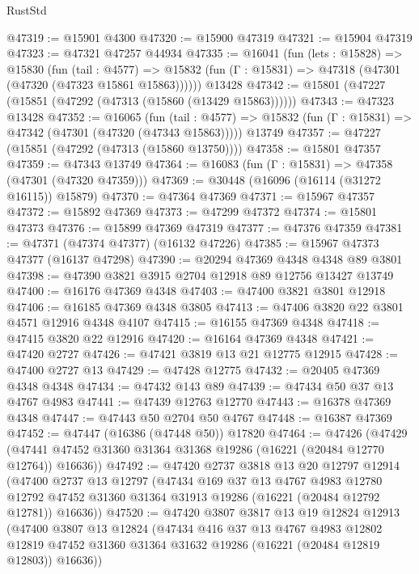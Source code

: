\begin{lexlean}{RustStd}
\begin{coremodule}
@47319 := @15901 @4300
@47320 := @15900 @47319
@47321 := @15904 @47319
@47323 := @47321 @47257 @44934
@47335 := @16041
    (fun (lets : @15828) =>
    @15830
      (fun (tail : @4577) =>
      @15832 (fun (Γ : @15831) => @47318 (@47301 (@47320 (@47323 @15861 @15863))))))
    @13428
@47342 := @15801 (@47227 (@15851 (@47292 (@47313 (@15860 (@13429 @15863))))))
@47343 := @47323 @13428
@47352 := @16065
    (fun (tail : @4577) => @15832 (fun (Γ : @15831) => @47342 (@47301 (@47320 (@47343 @15863)))))
    @13749
@47357 := @47227 (@15851 (@47292 (@47313 (@15860 @13750))))
@47358 := @15801 @47357
@47359 := @47343 @13749
@47364 := @16083 (fun (Γ : @15831) => @47358 (@47301 (@47320 @47359)))
@47369 := @30448 (@16096 (@16114 (@31272 @16115)) @15879)
@47370 := @47364 @47369
@47371 := @15967 @47357
@47372 := @15892 @47369
@47373 := @47299 @47372
@47374 := @15801 @47373
@47376 := @15899 @47369 @47319
@47377 := @47376 @47359
@47381 := @47371 (@47374 @47377) (@16132 @47226)
@47385 := @15967 @47373 @47377 (@16137 @47298)
@47390 := @20294 @47369 @4348 @4348 @89 @3801
@47398 := @47390 @3821 @3915 @2704 @12918 @89 @12756 @13427 @13749
@47400 := @16176 @47369 @4348
@47403 := @47400 @3821 @3801 @12918
@47406 := @16185 @47369 @4348 @3805
@47413 := @47406 @3820 @22 @3801 @4571 @12916 @4348 @4107
@47415 := @16155 @47369 @4348
@47418 := @47415 @3820 @22 @12916
@47420 := @16164 @47369 @4348
@47421 := @47420 @2727
@47426 := @47421 @3819 @13 @21 @12775 @12915
@47428 := @47400 @2727 @13
@47429 := @47428 @12775
@47432 := @20405 @47369 @4348 @4348
@47434 := @47432 @143 @89
@47439 := @47434 @50 @37 @13 @4767 @4983
@47441 := @47439 @12763 @12770
@47443 := @16378 @47369 @4348
@47447 := @47443 @50 @2704 @50 @4767
@47448 := @16387 @47369
@47452 := @47447 (@16386 (@47448 @50)) @17820
@47464 := @47426
    (@47429 (@47441 @47452 @31360 @31364 @31368 @19286 (@16221 (@20484 @12770 @12764)) @16636))
@47492 := @47420
    @2737
    @3818
    @13
    @20
    @12797
    @12914
    (@47400
      @2737
      @13
      @12797
      (@47434
        @169
        @37
        @13
        @4767
        @4983
        @12780
        @12792
        @47452
        @31360
        @31364
        @31913
        @19286
        (@16221 (@20484 @12792 @12781))
        @16636))
@47520 := @47420
    @3807
    @3817
    @13
    @19
    @12824
    @12913
    (@47400
      @3807
      @13
      @12824
      (@47434
        @416
        @37
        @13
        @4767
        @4983
        @12802
        @12819
        @47452
        @31360
        @31364
        @31632
        @19286
        (@16221 (@20484 @12819 @12803))
        @16636))

\end{coremodule}
\end{lexlean}
